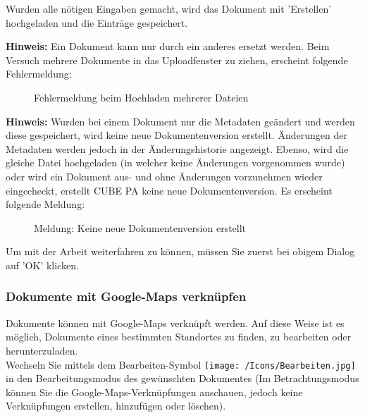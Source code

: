 Wurden alle nötigen Eingaben gemacht, wird das Dokument mit 'Erstellen'  hochgeladen und die Einträge gespeichert. \newline

\textbf{Hinweis:} Ein Dokument kann nur durch ein anderes ersetzt werden. Beim Versuch mehrere Dokumente in das Uploadfenster zu ziehen, erscheint folgende Fehlermeldung:

\begin{figure}[H]
\caption{Fehlermeldung beim Hochladen mehrerer Dateien}
\end{figure}

\textbf{Hinweis:} Wurden bei einem Dokument nur die Metadaten geändert und werden diese gespeichert, wird keine neue Dokumentenversion erstellt. Änderungen der Metadaten werden jedoch in der Änderungshistorie angezeigt. Ebenso, wird die gleiche Datei hochgeladen (in welcher keine Änderungen vorgenommen wurde) oder wird ein Dokument aus- und ohne Änderungen vorzunehmen wieder eingecheckt, erstellt CUBE PA keine neue Dokumentenversion. Es erscheint folgende Meldung:

\begin{figure}[H]
\caption{Meldung: Keine neue Dokumentenversion erstellt}
\end{figure}

Um mit der Arbeit weiterfahren zu können, müssen Sie zuerst bei obigem Dialog auf 'OK' klicken.

\subsubsection{Dokumente mit Google-Maps verknüpfen}
\label{bkm:Ref442545553}
Dokumente können mit Google-Maps verknüpft werden. Auf diese Weise ist es möglich, Dokumente eines bestimmten Standortes zu finden, zu bearbeiten oder herunterzuladen. \\
Wechseln Sie mittels dem Bearbeiten-Symbol \texttt{[image: /Icons/Bearbeiten.jpg]} in den Bearbeitungsmodus des gewünschten Dokumentes (Im Betrachtungsmodus können Sie die Google-Maps-Verknüpfungen anschauen, jedoch keine Verknüpfungen erstellen, hinzufügen oder löschen).

